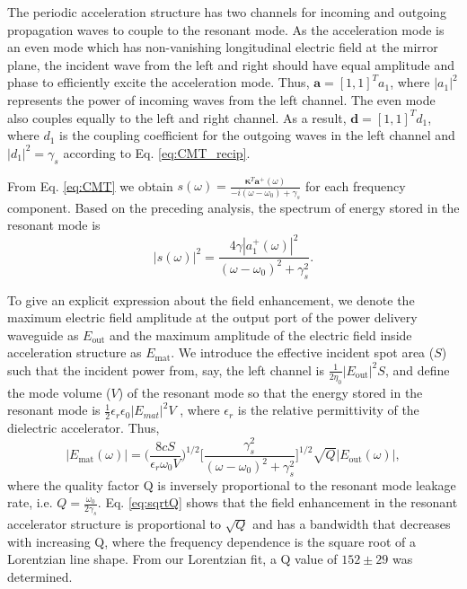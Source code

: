The periodic acceleration structure has two channels for incoming and outgoing propagation waves to couple to the resonant mode. As the acceleration mode is an even mode which has non-vanishing longitudinal electric field at the mirror plane, the incident wave from the left and right should have equal amplitude and phase to efficiently excite the acceleration mode. Thus, $\boldsymbol{a} = [1, 1]^T a_1$, where $|a_1|^2$ represents the power of incoming waves from the left channel. The even mode also couples equally to the left and right channel. As a result, $\boldsymbol{d} = [1, 1]^T d_1$, where $d_1$ is the coupling coefficient for the outgoing waves in the left channel and $|d_1|^2 = \gamma_s$ according to Eq. \ref{eq:CMT_recip}.

From Eq. \ref{eq:CMT} we obtain $s(\omega) = 
\frac{\boldsymbol{\kappa}^T \boldsymbol{a}^+(\omega)}{-i(\omega - \omega_0) + \gamma_s}$ for each frequency component. Based on the preceding analysis, the spectrum of energy stored in the resonant mode is
\begin{equation}
|s(\omega)|^2 = \frac{ 4\gamma |a_1^+(\omega)|^2}{(\omega - \omega_0)^2 + \gamma_s^2}.
\end{equation}

To give an explicit expression about the field enhancement, we denote the maximum electric field amplitude at the output port of the power delivery waveguide as $E_\textrm{out}$ and the maximum amplitude of the electric field inside acceleration structure as $E_\textrm{mat}$. We introduce the effective incident spot area ($S$) such that the incident power from, say, the left channel is $\frac{1}{2\eta_0}|E_\textrm{out}|^2S$, and define the mode volume ($V$) of the resonant mode so that the energy stored in the resonant mode is $\frac{1}{2}\epsilon_r \epsilon_0 |E_{mat}|^2V$ \cite{jackson2007classical}, where $\epsilon_r$ is the relative permittivity of the dielectric accelerator. Thus,
\begin{equation}
\label{eq:sqrtQ}
|E_\textrm{mat}(\omega)| = \Big(\frac{8cS}{\epsilon_r \omega_0 V}\Big)^{1/2} \Big[ \frac{\gamma_s^2}{(\omega - \omega_0)^2 + \gamma_s^2} \Big]^{1/2} \sqrt{Q} |E_\textrm{out}(\omega)|,
\end{equation}
where the quality factor Q is inversely proportional to the resonant mode leakage rate, i.e. $Q = \frac{\omega_0}{2\gamma_s}$. Eq. \ref{eq:sqrtQ} shows that the field enhancement in the resonant accelerator structure is proportional to $\sqrt{Q}$ and has a bandwidth that decreases with increasing Q, where the frequency dependence is the square root of a Lorentzian line shape.
From our Lorentzian fit, a Q value of $152 \pm 29$ was determined.

